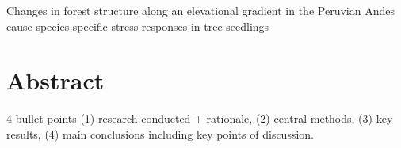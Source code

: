 \documentclass[a4paper,11pt]{article}
\begin{document}
\setlength{\parskip}{10pt}   %
\setlength{\headsep}{30pt} %
\setlength{\parindent}{0pt} %
%
%
%
\raggedright %
\begin{center}{\LARGE{Changes in forest structure along an elevational gradient in the Peruvian Andes cause species-specific stress responses in tree seedlings}}\end{center}  %

\section{Abstract}
4 bullet points (1) research conducted + rationale, (2) central methods, (3) key results, (4) main conclusions including key points of discussion. 
\end{document}
